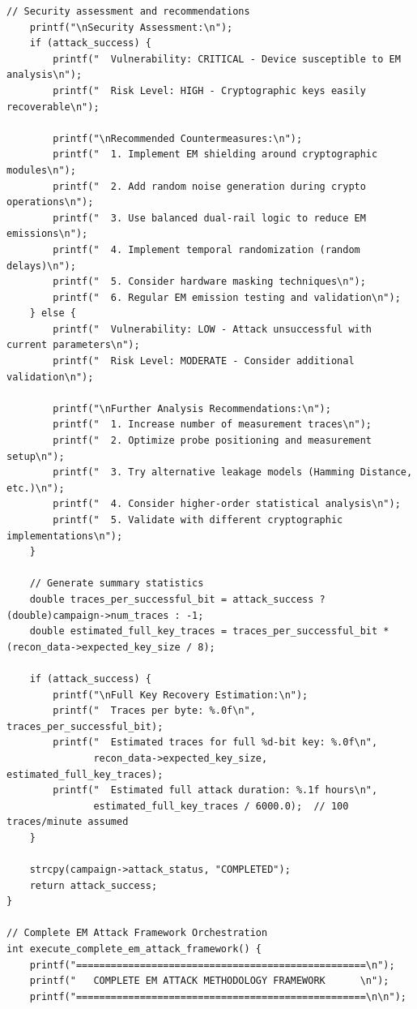 \documentclass[11pt,a4paper]{article}
\theoremstyle{definition}
\begin{document}
\begin{lstlisting}[caption={Complete EM Attack Methodology Framework Implementation}]
    // Security assessment and recommendations
    printf("\nSecurity Assessment:\n");
    if (attack_success) {
        printf("  Vulnerability: CRITICAL - Device susceptible to EM analysis\n");
        printf("  Risk Level: HIGH - Cryptographic keys easily recoverable\n");
        
        printf("\nRecommended Countermeasures:\n");
        printf("  1. Implement EM shielding around cryptographic modules\n");
        printf("  2. Add random noise generation during crypto operations\n");
        printf("  3. Use balanced dual-rail logic to reduce EM emissions\n");
        printf("  4. Implement temporal randomization (random delays)\n");
        printf("  5. Consider hardware masking techniques\n");
        printf("  6. Regular EM emission testing and validation\n");
    } else {
        printf("  Vulnerability: LOW - Attack unsuccessful with current parameters\n");
        printf("  Risk Level: MODERATE - Consider additional validation\n");
        
        printf("\nFurther Analysis Recommendations:\n");
        printf("  1. Increase number of measurement traces\n");
        printf("  2. Optimize probe positioning and measurement setup\n");
        printf("  3. Try alternative leakage models (Hamming Distance, etc.)\n");
        printf("  4. Consider higher-order statistical analysis\n");
        printf("  5. Validate with different cryptographic implementations\n");
    }
    
    // Generate summary statistics
    double traces_per_successful_bit = attack_success ? (double)campaign->num_traces : -1;
    double estimated_full_key_traces = traces_per_successful_bit * (recon_data->expected_key_size / 8);
    
    if (attack_success) {
        printf("\nFull Key Recovery Estimation:\n");
        printf("  Traces per byte: %.0f\n", traces_per_successful_bit);
        printf("  Estimated traces for full %d-bit key: %.0f\n", 
               recon_data->expected_key_size, estimated_full_key_traces);
        printf("  Estimated full attack duration: %.1f hours\n", 
               estimated_full_key_traces / 6000.0);  // 100 traces/minute assumed
    }
    
    strcpy(campaign->attack_status, "COMPLETED");
    return attack_success;
}

// Complete EM Attack Framework Orchestration
int execute_complete_em_attack_framework() {
    printf("==================================================\n");
    printf("   COMPLETE EM ATTACK METHODOLOGY FRAMEWORK      \n");
    printf("==================================================\n\n");
    

\end{lstlisting}
\end{document}

